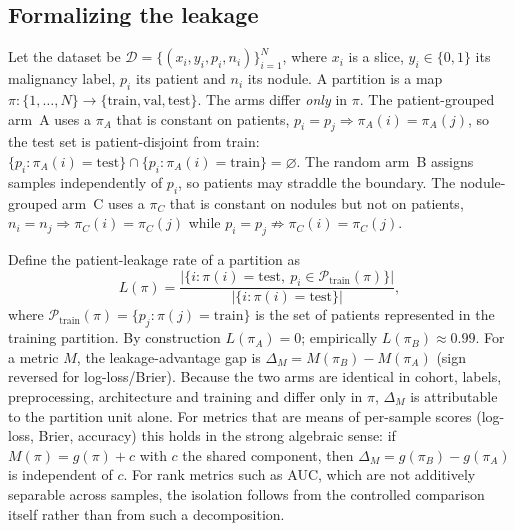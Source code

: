 \documentclass{ieeeaccess}
\begin{document}
\subsection{Formalizing the leakage}
Let the dataset be $\mathcal{D}=\{(x_i,y_i,p_i,n_i)\}_{i=1}^{N}$, where $x_i$ is a slice, $y_i\in\{0,1\}$
its malignancy label, $p_i$ its patient and $n_i$ its nodule. A partition is a map
$\pi:\{1,\dots,N\}\to\{\mathrm{train},\mathrm{val},\mathrm{test}\}$. The arms differ \emph{only}
in $\pi$. The patient-grouped arm~A uses a $\pi_A$ that is constant on patients,
$p_i=p_j \Rightarrow \pi_A(i)=\pi_A(j)$, so the test set is patient-disjoint from train:
$\{p_i:\pi_A(i)=\mathrm{test}\}\cap\{p_i:\pi_A(i)=\mathrm{train}\}=\varnothing$. The random arm~B
assigns samples independently of $p_i$, so patients may straddle the boundary. The nodule-grouped
arm~C uses a $\pi_C$ that is constant on nodules but not on patients,
$n_i=n_j \Rightarrow \pi_C(i)=\pi_C(j)$ while $p_i=p_j \not\Rightarrow \pi_C(i)=\pi_C(j)$.

Define the patient-leakage rate of a partition as
\begin{equation}
L(\pi)=\frac{\bigl|\{i:\pi(i)=\mathrm{test},\ p_i\in\mathcal{P}_{\mathrm{train}}(\pi)\}\bigr|}
{\bigl|\{i:\pi(i)=\mathrm{test}\}\bigr|},
\end{equation}
where $\mathcal{P}_{\mathrm{train}}(\pi)=\{p_j:\pi(j)=\mathrm{train}\}$ is the set of patients
represented in the training partition.
By construction $L(\pi_A)=0$; empirically $L(\pi_B)\approx0.99$. For a metric $M$, the
leakage-advantage gap is $\Delta_M=M(\pi_B)-M(\pi_A)$ (sign reversed for log-loss/Brier). Because the
two arms are identical in cohort, labels, preprocessing, architecture and training and differ only
in $\pi$, $\Delta_M$ is attributable to the partition unit alone. For metrics that are means of
per-sample scores (log-loss, Brier, accuracy) this holds in the strong algebraic sense: if
$M(\pi)=g(\pi)+c$ with $c$ the shared component, then $\Delta_M=g(\pi_B)-g(\pi_A)$ is independent of
$c$. For rank metrics such as AUC, which are not additively separable across samples, the isolation
follows from the controlled comparison itself rather than from such a decomposition.
\end{document}
